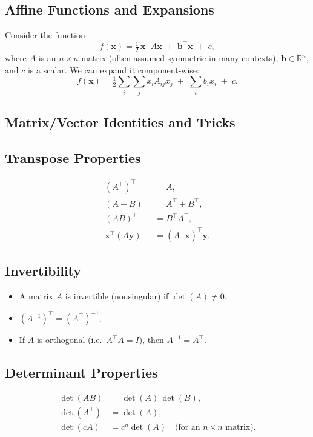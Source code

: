 \subsection{Affine Functions and Expansions}
Consider the function
\[
f(\mathbf{x}) 
= \tfrac{1}{2}\,\mathbf{x}^\top A \mathbf{x} \;+\; \mathbf{b}^\top \mathbf{x} \;+\; c,
\]
where \(A\) is an \(n \times n\) matrix (often assumed symmetric in many contexts), \(\mathbf{b} \in \mathbb{R}^n\), 
and \(c\) is a scalar. We can expand it component-wise:
\[
f(\mathbf{x}) 
= \tfrac{1}{2} \sum_{i}\sum_{j} x_i A_{ij} x_j \;+\; \sum_{i} b_i x_i \;+\; c.
\]

\subsection{Matrix/Vector Identities and Tricks}

\subsection*{Transpose Properties}
\begin{align*}
(A^\top)^\top &= A, \\
(A + B)^\top &= A^\top + B^\top, \\
(AB)^\top &= B^\top A^\top, \\
\mathbf{x}^\top (A \mathbf{y}) &= (A^\top \mathbf{x})^\top \mathbf{y}.
\end{align*}

\subsection*{Invertibility}
\begin{itemize}
  \item A matrix \(A\) is invertible (nonsingular) if \(\det(A) \neq 0\).
  \item \((A^{-1})^\top = (A^\top)^{-1}\).
  \item If \(A\) is orthogonal (i.e.\ \(A^\top A = I\)), then \(A^{-1} = A^\top\).
\end{itemize}

\subsection*{Determinant Properties}
\begin{align*}
\det(AB) &= \det(A)\,\det(B), \\
\det(A^\top) &= \det(A), \\
\det(cA) &= c^n \det(A) \quad \text{(for an }n \times n\text{ matrix).}
\end{align*}

